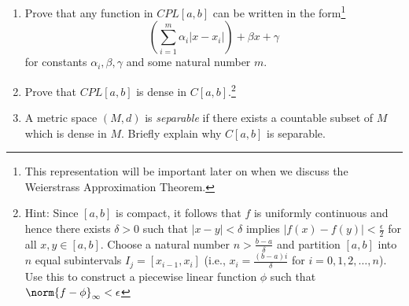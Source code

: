 \documentclass{homework}
\begin{document}
\begin{Exercise}
\begin{enumerate}
    \begin{solution}
    \end{solution}

  \item Prove that any function in $CPL[a,b]$ can be written in the
    form\footnote{This representation will be important later on when
      we discuss the Weierstrass Approximation Theorem.}
    \begin{equation*}
      \left( \sum_{i=1}^m \alpha_i | x - x_i| \right) + \beta x +
      \gamma
    \end{equation*}
    for constants $\alpha_i,\beta,\gamma$ and some natural number $m$.

    \begin{solution}
    \end{solution}

  \item Prove that $CPL[a,b]$ is dense in $C[a,b]$.\footnote{Hint:
      Since $[a,b]$ is compact, it follows that $f$ is uniformly
      continuous and hence there exists $\delta > 0$ such that
      $|x - y| < \delta$ implies $|f(x) - f(y)| < \tfrac{\epsilon}{2}$
      for all $x,y \in [a,b]$.  Choose a natural number
      $n > \frac{b-a}{\delta}$ and partition $[a,b]$ into $n$ equal
      subintervals $I_j = [x_{i-1},x_i]$ (i.e.,
      $x_i = \frac{(b-a)i}{\delta}$ for $i=0,1,2,\ldots,n$).  Use this
      to construct a piecewise linear function $\phi$ such that
      $\norm{f - \phi}_{\infty} < \epsilon$}

    \begin{solution}
    \end{solution}

  \item A metric space $(M,d)$ is \emph{separable} if there exists a
    countable subset of $M$ which is dense in $M$.  Briefly explain
    why $C[a,b]$ is separable.

    \begin{solution}
    \end{solution}

	\end{enumerate}
\end{Exercise}
\end{document}
